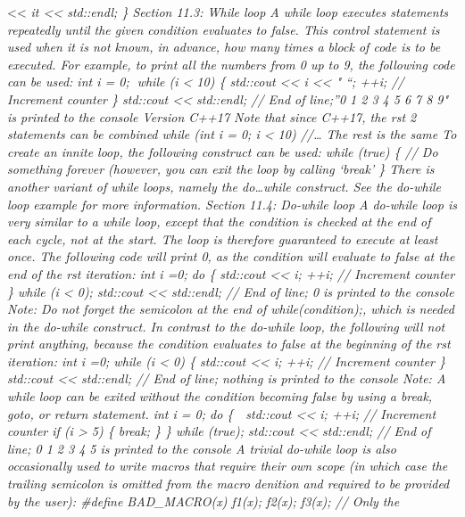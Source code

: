\textless\textless{} \emph{it \textless\textless{} std::endl; \} Section
11.3: While loop A while loop executes statements repeatedly until the
given condition evaluates to false. This control statement is used when
it is not known, in advance, how many times a block of code is to be
executed. For example, to print all the numbers from 0 up to 9, the
following code can be used: int i = 0; while (i \textless{} 10) \{
std::cout \textless\textless{} i \textless\textless{} " ``; ++i; //
Increment counter \} std::cout \textless\textless{} std::endl; // End of
line;''0 1 2 3 4 5 6 7 8 9" is printed to the console Version C++17 Note
that since C++17, the rst 2 statements can be combined while (int i = 0;
i \textless{} 10) //\ldots{} The rest is the same To create an innite
loop, the following construct can be used: while (true) \{ // Do
something forever (however, you can exit the loop by calling `break' \}
There is another variant of while loops, namely the do\ldots while
construct. See the do-while loop example for more information. Section
11.4: Do-while loop A do-while loop is very similar to a while loop,
except that the condition is checked at the end of each cycle, not at
the start. The loop is therefore guaranteed to execute at least once.
The following code will print 0, as the condition will evaluate to false
at the end of the rst iteration: int i =0; do \{ std::cout
\textless\textless{} i; ++i; // Increment counter \} while (i
\textless{} 0); std::cout \textless\textless{} std::endl; // End of
line; 0 is printed to the console Note: Do not forget the semicolon at
the end of while(condition);, which is needed in the do-while construct.
In contrast to the do-while loop, the following will not print anything,
because the condition evaluates to false at the beginning of the rst
iteration: int i =0; while (i \textless{} 0) \{ std::cout
\textless\textless{} i; ++i; // Increment counter \} std::cout
\textless\textless{} std::endl; // End of line; nothing is printed to
the console Note: A while loop can be exited without the condition
becoming false by using a break, goto, or return statement. int i = 0;
do \{  std::cout \textless\textless{} i; ++i; // Increment counter if
(i \textgreater{} 5) \{ break; \} \} while (true); std::cout
\textless\textless{} std::endl; // End of line; 0 1 2 3 4 5 is printed
to the console A trivial do-while loop is also occasionally used to
write macros that require their own scope (in which case the trailing
semicolon is omitted from the macro denition and required to be provided
by the user): \#define BAD\_MACRO(x) f1(x); f2(x); f3(x); // Only the
}
